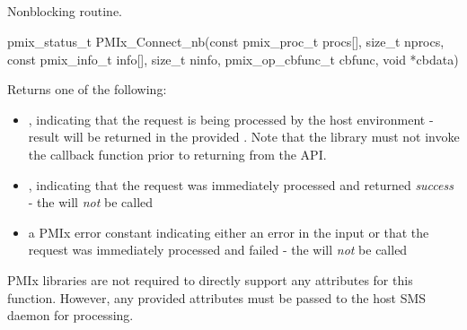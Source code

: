 \subsection{}

\summary

Nonblocking  routine.

\format

\cspecificstart
\begin{codepar}
pmix_status_t
PMIx_Connect_nb(const pmix_proc_t procs[], size_t nprocs,
                const pmix_info_t info[], size_t ninfo,
                pmix_op_cbfunc_t cbfunc, void *cbdata)
\end{codepar}
\cspecificend

\begin{arglist}
\end{arglist}

Returns one of the following:

\begin{itemize}
    \item {}, indicating that the request is being processed by the host environment - result will be returned in the provided . Note that the library must not invoke the callback function prior to returning from the \ac{API}.
    \item {}, indicating that the request was immediately processed and returned \textit{success} - the  will \textit{not} be called
    \item a PMIx error constant indicating either an error in the input or that the request was immediately processed and failed - the  will \textit{not} be called
\end{itemize}


\reqattrstart
\ac{PMIx} libraries are not required to directly support any attributes for this function. However, any provided attributes must be passed to the host \ac{SMS} daemon for processing.

